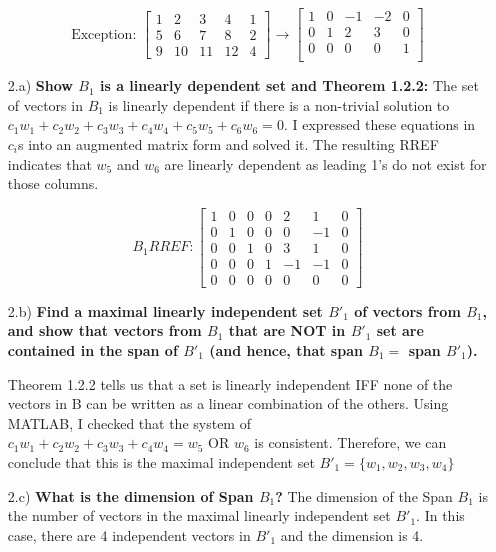 \documentclass[10pt]{article}
\begin{document}
\begin{enumerate}[leftmargin=\labelsep]
       $$\text{Exception: } \begin{bmatrix}\label{eq1}
        1 & 2 & 3 & 4 & 1\\
        5 & 6 & 7 & 8 & 2\\
        9 & 10 & 11 & 12 & 4
        \end{bmatrix} 
        \to
        \begin{bmatrix}
        1 & 0 & -1 & -2 & 0 \\
        0 & 1 & 2 & 3 & 0 \\
        0 & 0 & 0 & 0 & 1\\
        \end{bmatrix}$$

    \item[2.a)] \textbf{Show $B_1$ is a linearly dependent set and Theorem 1.2.2: } The set of vectors in $B_1$ is linearly dependent if there is a non-trivial solution to $c_1w_1 + c_2w_2 + c_3w_3 + c_4w_4 + c_5w_5 + c_6w_6 = 0$. I expressed these equations in $c_i$s into an augmented matrix form and solved it.
    The resulting RREF indicates that $w_5$ and $w_6$ are linearly dependent as leading 1's do not exist for those columns.
    
        $$B_1 RREF: \begin{bmatrix}
        1 & 0 & 0 & 0 & 2 & 1 & 0\\
        0 & 1 & 0 & 0 & 0 & -1 & 0\\
        0 & 0 & 1 & 0 & 3 & 1 & 0\\ 
        0 & 0 & 0 & 1 & -1 & -1 &0\\
        0 & 0 & 0 & 0 & 0 & 0 & 0
        \end{bmatrix}$$

    \item[2.b)] \textbf{Find a maximal linearly independent set $B′_1$ of vectors from $B_1$, and show that vectors from $B_1$ that are NOT in $B′_1$ set are contained in the span of $B′_1$ (and hence, that span $B_1 =$ span $B′_1$).}
        
   Theorem 1.2.2 tells us that a set is linearly independent IFF none of the vectors in B can be written as a linear combination of the others. Using MATLAB, I checked that the system of $c_1w_1 + c_2w_2 + c_3w_3 + c_4w_4 = w_5 \text{ OR } w_6$ is consistent. Therefore, we can conclude that this is the maximal independent set $B'_1 = \{w_1, w_2, w_3, w_4\}$
        
    \item[2.c)] \textbf{What is the dimension of Span $B_1$?} The dimension of the Span $B_1$ is the number of vectors in the maximal linearly independent set $B'_1$. In this case, there are 4 independent vectors in $B'_1$ and the dimension is 4.
        

\end{enumerate}
\end{document}
